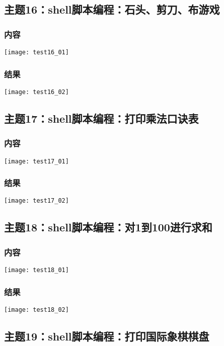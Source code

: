 \documentclass{article}
\begin{document}
\subsection{主题16：shell脚本编程：石头、剪刀、布游戏} 
\subsubsection{内容}
\texttt{[image: test16\_01]}\\
\subsubsection{结果}  
\texttt{[image: test16\_02]}\\
\vspace{1cm}
\subsection{主题17：shell脚本编程：打印乘法口诀表}  
\subsubsection{内容}
\texttt{[image: test17\_01]}\\
\subsubsection{结果}  
\texttt{[image: test17\_02]}\\
\vspace{1cm}
\subsection{主题18：shell脚本编程：对1到100进行求和}  
\subsubsection{内容}
\texttt{[image: test18\_01]}\\
\subsubsection{结果}  
\texttt{[image: test18\_02]}\\
\vspace{1cm}
\subsection{主题19：shell脚本编程：打印国际象棋棋盘}  
\end{document}
